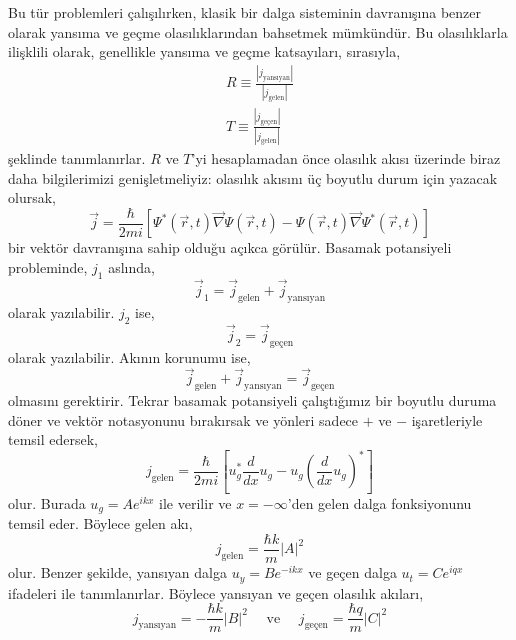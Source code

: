 \documentclass[a4paper,12pt, twoside]{article}
\begin{document}
Bu tür problemleri çalışılırken, klasik bir dalga sisteminin davranışına benzer olarak yansıma ve geçme olasılıklarından bahsetmek mümkündür. Bu olasılıklarla ilişklili olarak, genellikle yansıma ve geçme katsayıları, sırasıyla,
\begin{align}
R \equiv \frac{|j_\text{yansıyan}|}{|j_\text{gelen}|} \\
T \equiv \frac{|j_\text{geçen}|}{|j_\text{gelen}|}
\end{align}
şeklinde tanımlanırlar. $R$ ve $T$'yi hesaplamadan önce olasılık akısı üzerinde biraz daha bilgilerimizi genişletmeliyiz: olasılık akısını üç boyutlu durum için yazacak olursak,
\begin{equation}
\vec j = \frac{\hbar}{2 m i} \left[
\Psi^*(\vec r, t) \vec \nabla \Psi(\vec r, t) - 
\Psi(\vec r, t) \vec \nabla \Psi^*(\vec r, t)
\right]
\end{equation}
bir vektör davranışına sahip olduğu açıkca görülür. Basamak potansiyeli probleminde, $j_1$ aslında,
\begin{equation}
\vec j_1 = \vec j_\text{gelen} + \vec j_\text{yansıyan}
\end{equation}
olarak yazılabilir. $j_2$ ise,
\begin{equation}
\vec j_2 = \vec j_\text{geçen}
\end{equation}
olarak yazılabilir. Akının korunumu ise,
\begin{equation}
\vec j_\text{gelen} + \vec j_\text{yansıyan} = \vec j_\text{geçen}
\end{equation}
olmasını gerektirir. Tekrar basamak potansiyeli çalıştığımız bir boyutlu duruma döner ve vektör notasyonunu bırakırsak ve yönleri sadece $+$ ve $-$ işaretleriyle temsil edersek,
\begin{equation}
j_\text{gelen} =  \frac{\hbar}{2 m i} \left[u^*_g \frac{d}{dx}u_g - u_g (\frac{d}{dx}u_g)^*\right]
\end{equation}
olur. Burada $u_g = A e ^ { i k x } $ ile verilir ve $x=-\infty$'den gelen dalga fonksiyonunu temsil eder. Böylece gelen akı,
\begin{equation}
j_\text{gelen} =  \frac{\hbar k}{m} |A|^2
\end{equation}
olur. Benzer şekilde, yansıyan dalga $u_y = B e ^ { -i k x } $ ve geçen dalga $u_t = C e ^ { i q x } $ ifadeleri ile tanımlanırlar. Böylece yansıyan ve geçen olasılık akıları,
\begin{equation}
j_\text{yansıyan} =  -\frac{\hbar k}{m} |B|^2 \quad \text{ ve } \quad
j_\text{geçen} =  \frac{\hbar q}{m} |C|^2 
\end{equation}
\end{document}
